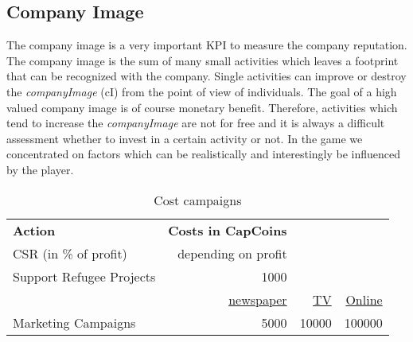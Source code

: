 \subsection{Company Image} \label{company_image}

The company image is a very important KPI to measure the company reputation. The company image is the sum of many small activities which leaves a footprint that can be recognized with the company. Single activities can improve or destroy the \textit{companyImage} (\gls{cI}) from the point of view of individuals. The goal of a high valued company image is of course monetary benefit. Therefore, activities which tend to increase the \textit{companyImage} are not for free and it is always a difficult assessment whether to invest in a certain activity or not. In the game we concentrated on factors which can be realistically and interestingly be influenced by the player.

\begin{table}[]
\centering
\begin{tabular}{|l|r|r|r|}
\hline
\multicolumn{1}{|l|}{\textbf{Action}} & \multicolumn{1}{l}{\textbf{Costs in CapCoins}} & \multicolumn{1}{l}{} & \multicolumn{1}{l|}{} \\
CSR (in \% of profit)     & depending on profit &                   & \\
Support Refugee Projects  & 1000        &                   & \\
  & \underline{newspaper} & \underline{TV}      &  \underline{Online} \\
Marketing Campaigns       & 5000                & 10000             & 100000 \\
\hline
\end{tabular}
\caption{Cost campaigns}
\label{cost_campaigns}
\end{table}

